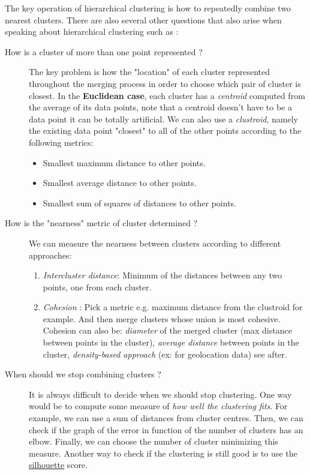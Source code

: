 The key operation of hierarchical clustering is how to repeatedly combine two nearest clusters. There are also several other questions that also arise when speaking about hierarchical clustering such as :
\begin{description}
	\item [How is a cluster of more than one point represented ?]
The key problem is how the "location" of each cluster represented throughout the merging process in order to choose which pair of cluster is closest. In the \textbf{Euclidean case}, each cluster has a \emph{centroid} computed from the average of its data points, note that a centroid doesn't have to be a data point it can be totally artificial. We can also use a \emph{clustroid}, namely the existing data point "closest" to all of the other points according to the following metrics:
\begin{itemize}
	\item Smallest maximum distance to other points.
	\item Smallest average distance to other points.
	\item Smallest sum of squares of distances to other points.
\end{itemize}
	\item [How is the "nearness" metric of cluster determined ?]
We can measure the nearness between clusters according to different approaches:
\begin{enumerate}
	\item \emph{Intercluster distance}: Minimum of the distances between any two points, one from each cluster.
	\item \emph{Cohesion} : Pick a metric e.g. maximum distance from the clustroid for example. And then merge clusters whose union is most cohesive. Cohesion can also be: \emph{diameter} of the merged cluster (max distance between points in the cluster), \emph{average distance} between points in the cluster, \emph{density-based approach} (ex: for geolocation data) see after.
\end{enumerate} 
	\item [When should we stop combining clusters ?] 
	It is always difficult to decide when we should stop clustering. One way would be to compute some measure of \emph{how well the clustering fits}. For example, we can use a sum of distances from cluster centres. Then, we can check if the graph of the error in function of the number of clusters has an elbow. Finally, we can choose the number of cluster minimizing this measure. Another way to check if the clustering is still good is to use the \href{https://en.wikipedia.org/wiki/Silhouette\_(clustering)}{silhouette} score. 
\end{description}

